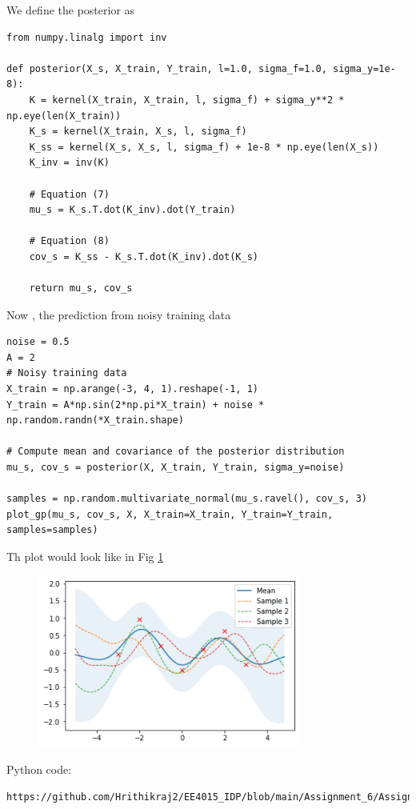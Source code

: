 \documentclass[journal,12pt,twocolumn]{IEEEtran}
\begin{document}
We define the posterior as
\begin{lstlisting}
from numpy.linalg import inv

def posterior(X_s, X_train, Y_train, l=1.0, sigma_f=1.0, sigma_y=1e-8):
    K = kernel(X_train, X_train, l, sigma_f) + sigma_y**2 * np.eye(len(X_train))
    K_s = kernel(X_train, X_s, l, sigma_f)
    K_ss = kernel(X_s, X_s, l, sigma_f) + 1e-8 * np.eye(len(X_s))
    K_inv = inv(K)
    
    # Equation (7)
    mu_s = K_s.T.dot(K_inv).dot(Y_train)

    # Equation (8)
    cov_s = K_ss - K_s.T.dot(K_inv).dot(K_s)
    
    return mu_s, cov_s
\end{lstlisting}
Now , the prediction from noisy training data
\begin{lstlisting}
noise = 0.5
A = 2  
# Noisy training data
X_train = np.arange(-3, 4, 1).reshape(-1, 1)
Y_train = A*np.sin(2*np.pi*X_train) + noise * np.random.randn(*X_train.shape)

# Compute mean and covariance of the posterior distribution
mu_s, cov_s = posterior(X, X_train, Y_train, sigma_y=noise)

samples = np.random.multivariate_normal(mu_s.ravel(), cov_s, 3)
plot_gp(mu_s, cov_s, X, X_train=X_train, Y_train=Y_train, samples=samples)
\end{lstlisting}
Th plot would look like in Fig \ref{fig:1}
\begin{figure}[!h]
\begin{center}
\includegraphics[width=3.4in]{figs/fig1.png}
\end{center}
\caption{}
\label{fig:1}
\end{figure}

Python code:
\begin{lstlisting}
https://github.com/Hrithikraj2/EE4015_IDP/blob/main/Assignment_6/Assignment_6.ipynb
\end{lstlisting}
\end{document}
